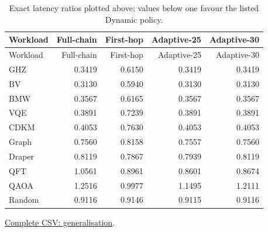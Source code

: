 \begin{center}\small
\begin{longtable}{lrrrr}
\caption{Exact latency ratios plotted above; values below one favour the listed Dynamic policy.}\\
\toprule
Workload & Full-chain & First-hop & Adaptive-25 & Adaptive-30 \\
\midrule\endfirsthead
\toprule
Workload & Full-chain & First-hop & Adaptive-25 & Adaptive-30 \\
\midrule\endhead
GHZ & 0.3419 & 0.6150 & 0.3419 & 0.3419 \\
BV & 0.3130 & 0.5940 & 0.3130 & 0.3130 \\
BMW & 0.3567 & 0.6165 & 0.3567 & 0.3567 \\
VQE & 0.3891 & 0.7239 & 0.3891 & 0.3891 \\
CDKM & 0.4053 & 0.7630 & 0.4053 & 0.4053 \\
Graph & 0.7560 & 0.8158 & 0.7557 & 0.7560 \\
Draper & 0.8119 & 0.7867 & 0.7939 & 0.8119 \\
QFT & 1.0561 & 0.8961 & 0.8601 & 0.8674 \\
QAOA & 1.2516 & 0.9977 & 1.1495 & 1.2111 \\
Random & 0.9116 & 0.9146 & 0.9115 & 0.9116 \\
\bottomrule\end{longtable}\end{center}
{\footnotesize \href{https://github.com/sanjeevkrishnaa/Compiler-Driven-ACE/blob/codex/ace-scheduler-correctness/docs/latex/oct25_pre_golden/data/generalisation.csv}{Complete CSV: generalisation}. }

